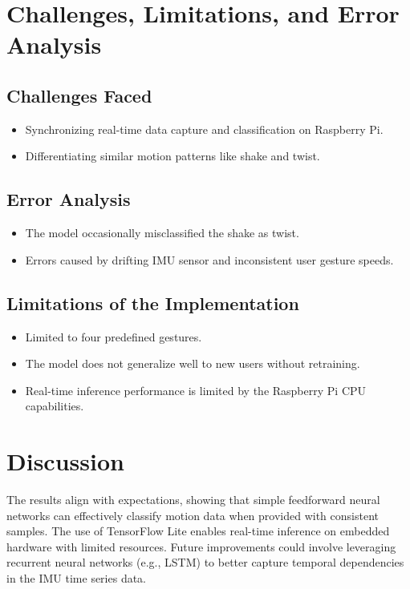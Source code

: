 \documentclass[a4paper,12pt]{article}
\begin{document}
\section{Challenges, Limitations, and Error Analysis}

\subsection{Challenges Faced}
\begin{itemize}
    \item Synchronizing real-time data capture and classification on Raspberry Pi.
    \item Differentiating similar motion patterns like shake and twist.
\end{itemize}

\subsection{Error Analysis}
\begin{itemize}
    \item The model occasionally misclassified the shake as twist.
    \item Errors caused by drifting IMU sensor and inconsistent user gesture speeds.
\end{itemize}

\subsection{Limitations of the Implementation}
\begin{itemize}
    \item Limited to four predefined gestures.
    \item The model does not generalize well to new users without retraining.
    \item Real-time inference performance is limited by the Raspberry Pi CPU capabilities.
\end{itemize}

\section{Discussion}
The results align with expectations, showing that simple feedforward neural networks can effectively classify motion data when provided with consistent samples. The use of TensorFlow Lite enables real-time inference on embedded hardware with limited resources. Future improvements could involve leveraging recurrent neural networks (e.g., LSTM) to better capture temporal dependencies in the IMU time series data.
\end{document}
